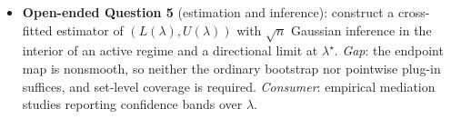 \documentclass[11pt]{article}
\theoremstyle{definition}
\theoremstyle{plain}
\theoremstyle{remark}
\begin{document}
\begin{itemize}[leftmargin=1.5em,itemsep=2pt]
        \emph{Gap}: extends the finite response-type LP geometry of \citet{BalkePearl1997Bounds} and
        \citet{FinkelsteinAdamsSariaShpitser2020MeasurementError} to a bilinear shared-$U$ program with no
        published vertex enumeration. \emph{Consumer}: software that reports front-door bounds.
  \item \textbf{Open-ended Question 5} (estimation and inference): construct a cross-fitted estimator of
        $(L(\lambda),U(\lambda))$ with $\sqrt n$ Gaussian inference in the interior of an active regime and
        a directional limit at $\lambda^\star$. \emph{Gap}: the endpoint map is nonsmooth, so neither the
        ordinary bootstrap \citep{FangSantos2019DirectionallyDifferentiable} nor pointwise plug-in suffices,
        and set-level coverage \citep{ChernozhukovHongTamer2007ParameterSets} is required. \emph{Consumer}:
        empirical mediation studies reporting confidence bands over $\lambda$.
\end{itemize}
\end{document}
